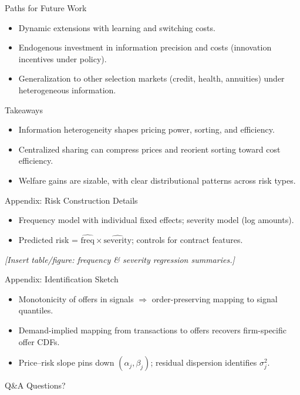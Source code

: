 \documentclass[10pt,aspectratio=169]{beamer}
\begin{document}
\begin{frame}{Paths for Future Work}
\justifying
\begin{itemize}
  \item Dynamic extensions with learning and switching costs.
  \item Endogenous investment in information precision and costs (innovation incentives under policy).
  \item Generalization to other selection markets (credit, health, annuities) under heterogeneous information.
\end{itemize}
\end{frame}

\begin{frame}{Takeaways}
\justifying
\begin{itemize}
  \item Information heterogeneity shapes pricing power, sorting, and efficiency.
  \item Centralized sharing can compress prices and reorient sorting toward cost efficiency.
  \item Welfare gains are sizable, with clear distributional patterns across risk types.
\end{itemize}
\end{frame}

\begin{frame}{Appendix: Risk Construction Details}
\justifying
\begin{itemize}
  \item Frequency model with individual fixed effects; severity model (log amounts).
  \item Predicted risk = $\widehat{\text{freq}} \times \widehat{\text{severity}}$; controls for contract features.
\end{itemize}
\vspace{0.75em}
\begin{center}
\textit{[Insert table/figure: frequency \& severity regression summaries.]}
\end{center}
\end{frame}

\begin{frame}{Appendix: Identification Sketch}
\justifying
\begin{itemize}
  \item Monotonicity of offers in signals $\Rightarrow$ order-preserving mapping to signal quantiles.
  \item Demand-implied mapping from transactions to offers recovers firm-specific offer CDFs.
  \item Price--risk slope pins down $(\alpha_j,\beta_j)$; residual dispersion identifies $\sigma_j^2$.
\end{itemize}
\end{frame}

\begin{frame}{Q\&A}
\centering
\Large Questions?
\end{frame}
\end{document}
